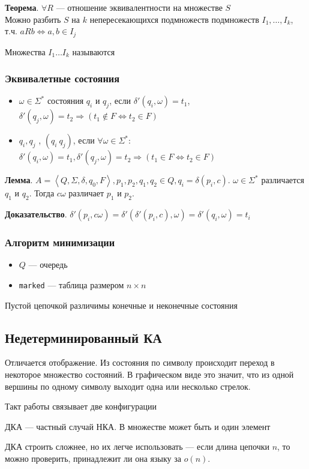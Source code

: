 \documentclass[a4paper, 14pt]{extarticle}
\begin{document}
\begin{tcolorbox}
    \textbf{Теорема}. $\forall R$ --- отношение эквивалентности на множестве $S$\\
    Можно разбить $S$ на $k$ непересекающихся подмножеств подмножеств $I_1, \ldots, I_k$, т.ч. $aRb \Leftrightarrow a, b \in I_j$
\end{tcolorbox}
Множества $I_1 \ldots I_k$ называются 

\subsubsection*{Эквивалетные состояния}
\begin{itemize}
    \item $\omega \in \Sigma^*$  состояния $q_i$ и $q_j$, если $\delta'(q_i, \omega) = t_1$, $\delta'(q_j, \omega) = t_2 \Rightarrow (t_1 \notin F \Leftrightarrow t_2 \in F )$
    \item $q_i, q_j$ , $(q_i ~ q_j)$, если $\forall \omega \in \Sigma^*$: $\delta'(q_i, \omega) = t_1, \delta'(q_j, \omega) = t_2 \Rightarrow (t_1 \in F \Leftrightarrow t_2 \in F)$
\end{itemize}

\begin{tcolorbox}
    \textbf{Лемма}. $A = \left\langle Q, \Sigma, \delta, q_0, F \right\rangle, p_1, p_2, q_1, q_2 \in Q, q_i = \delta(p_i, c) $. $ \omega \in \Sigma^* $ различается $q_1$ и $q_2$. Тогда $c\omega$ различает $p_1$ и $p_2$.
\end{tcolorbox}

\begin{tcolorbox}
    \textbf{Доказательство}. $ \delta'(p_i, c \omega) = \delta'( \delta'(p_i, c), \omega ) = \delta'(q_i, \omega) = t_i $ 
\end{tcolorbox}

\subsubsection*{Алгоритм минимизации} %
\begin{itemize}
    \item $Q$ --- очередь
    \item \texttt{marked} --- таблица размером $n \times n$
\end{itemize}

Пустой цепочкой различимы конечные и неконечные состояния

\subsection{Недетерминированный КА}
Отличается отображение. Из состояния по символу происходит переход в некоторое множество состояний. В графическом виде это значит, что из одной вершины по одному символу выходит одна или несколько стрелок.

Такт работы связывает две конфигурации

ДКА --- частный случай НКА. В множестве может быть и один элемент

ДКА строить сложнее, но их легче использовать --- если длина цепочки $n$, то можно проверить, принадлежит ли она языку за $o(n)$.
\end{document}
